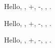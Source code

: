 \documentclass[border=5mm]{standalone}
\begin{document}
\begin{minipage}{22em}
  Hello, , \die+, \die-, , \die{}.

  \Large
  Hello, , \die+, \die[black]-, , \die[black]{}.

  \Huge
  Hello, , \die+, \die-, , \die{}.
\end{minipage}
\end{document}
